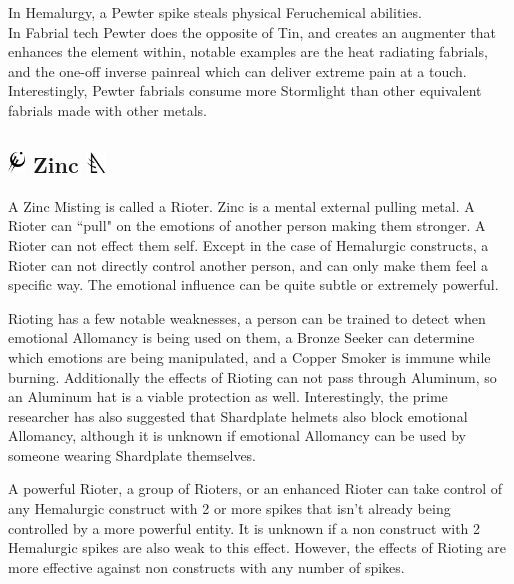 \documentclass[conference]{IEEEtran}
\begin{document}
In Hemalurgy, a Pewter spike steals physical Feruchemical abilities.\cite{HE-TB}\\

In Fabrial tech Pewter does the opposite of Tin, and creates an augmenter that enhances the element within,\cite{RoW-E9} notable examples are the heat radiating fabrials\cite{WoK-CH15}, and the one-off inverse painreal which can deliver extreme pain at a touch.\cite{RoW-CH84}  Interestingly, Pewter fabrials consume more Stormlight than other equivalent fabrials made with other metals.\cite{RoW-E9}

\subsection*{\includegraphics[height=1em]{images/Zinc.png}  Zinc \includegraphics[height=1em]{images/Zinc_(Feruchemy).png}}
A Zinc Misting is called a Rioter.\cite{ARS}  Zinc is a mental external pulling metal.\cite{AL-TB}  A Rioter can ``pull" on the emotions of another person making them stronger.\cite{ARS}  A Rioter can not effect them self.\cite{WoA-CH46}  Except in the case of Hemalurgic constructs,\cite{WoA-CH40}\cite{WoA-CH54} a Rioter can not directly control another person, and can only make them feel a specific way.\cite{TFE-CH4}  The emotional influence can be quite subtle or extremely powerful.\cite{TFE-CH10}

Rioting has a few notable weaknesses, a person can be trained to detect when emotional Allomancy is being used on them,\cite{TFE-CH2} a Bronze Seeker can determine which emotions are being manipulated,\cite{TFE-CH20} and a Copper Smoker is immune while burning.\cite{TFE-CH7}  Additionally the effects of Rioting can not pass through Aluminum, so an Aluminum hat is a viable protection as well.\cite{AoL-CH3}  Interestingly, the prime researcher has also suggested that Shardplate helmets also block emotional Allomancy,\cite{Shardplate} although it is unknown if emotional Allomancy can be used by someone wearing Shardplate themselves.

A powerful Rioter,\cite{WoF} a group of Rioters,\cite{HoA-CH5} or an enhanced Rioter\cite{WoA-CH54} can take control of any Hemalurgic construct\cite{WoA-CH40}\cite{WoA-CH54} with 2\cite{WoA-CH40} or more spikes that isn't already being controlled by a more powerful entity.\cite{HoA-CH3}  It is unknown if a non construct with 2 Hemalurgic spikes are also weak to this effect.  However, the effects of Rioting are more effective against non constructs with any number of spikes.  
\end{document}
